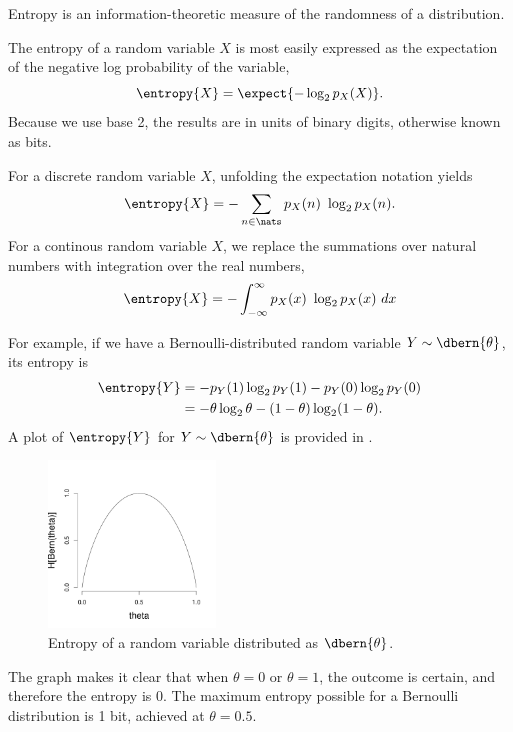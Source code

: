 Entropy is an information-theoretic measure of the randomness of a
distribution.  


The entropy of a random variable $X$ is most easily expressed as the
expectation of the negative log probability of the variable,
%
\begin{equation}
\entropy{X} = \expect{- \log_2 p_X(X)}.
\end{equation}
%
Because we use base 2, the results are in units of binary digits,
otherwise known as bits.

For a discrete random variable $X$, unfolding the expectation notation
yields
%
\begin{equation}
\entropy{X} = - \sum_{n \in \nats} p_X(n) \ \log_2 p_X(n).
\end{equation}
%
For a continous random variable $X$, we replace the summations
over natural numbers with integration over the real numbers,
%
\begin{equation}
\entropy{X} = - \int_{-\infty}^{\infty} p_X(x) \ \log_2 p_X(x) \ dx
\end{equation}

For example, if we have a Bernoulli-distributed random
variable $Y \sim \dbern{\theta}$, its entropy is
%
\begin{align}
\entropy{Y} &= - p_Y(1) \log_2 p_Y(1) - p_Y(0) \log_2 p_Y(0)
\\
&= - \theta \log_2 \theta - (1 - \theta) \log_2 (1 - \theta).
\end{align}
%
A plot of $\entropy{Y}$ for $Y \sim \dbern{\theta}$ is provided
in .
%
\begin{figure}
\begin{center}
\includegraphics[height=1.75in]{pdfs/bern-entropy.pdf}
\end{center}%
\vspace*{-18pt}
\caption{Entropy of a random variable distributed as $\dbern{\theta}$.}\label{fig:bern-entropy}
\end{figure}
%
The graph makes it clear that when $\theta=0$ or $\theta=1$, the
outcome is certain, and therefore the entropy is 0.  The maximum
entropy possible for a Bernoulli distribution is 1 bit, achieved at
$\theta = 0.5$.  


